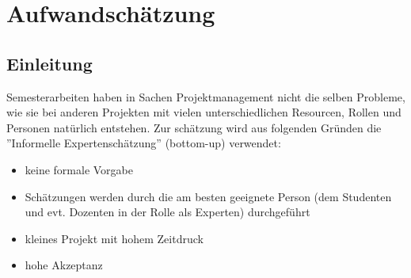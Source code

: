 \chapter{Aufwandsch\"atzung}
\section{Einleitung}
Semesterarbeiten haben in Sachen Projektmanagement nicht die selben Probleme, wie sie bei anderen Projekten mit vielen unterschiedlichen Resourcen, Rollen und Personen nat\"urlich entstehen. Zur sch\"atzung wird aus folgenden Gr\"unden die ''Informelle Expertensch\"atzung''\cite[S. 60]{BawiSwPm} (bottom-up) verwendet:

\begin{itemize}
 \item keine formale Vorgabe
 \item Sch\"atzungen werden durch die am besten geeignete Person (dem Studenten und evt. Dozenten in der Rolle als Experten) durchgef\"uhrt
 \item kleines Projekt mit hohem Zeitdruck
 \item hohe Akzeptanz
\end{itemize}

